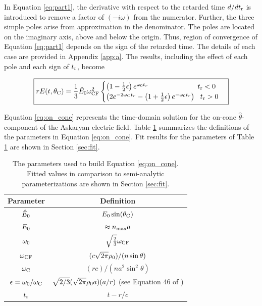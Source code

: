 \documentclass[amsmath,amssymb,aps,prd,10pt,twocolumn]{revtex4}
\begin{document}
In Equation \ref{eq:part1}, the derivative with respect to the retarded time $d/dt_{\rm r}$ is introduced to remove a factor of $(-i\omega)$ from the numerator.  Further, the three simple poles arise from approximation in the denominator.  The poles are located on the imaginary axis, above and below the origin.  Thus, region of convergence of Equation \ref{eq:part1} depends on the sign of the retarded time.  The details of each case are provided in Appendix \ref{app:a}.  The results, including the effect of each pole and each sign of $t_{\rm r}$, become

\begin{widetext}
\begin{equation}
\boxed{
r E(t,\theta_{\rm C}) = \frac{1}{3} \hat{E}_0 \omega_{\rm CF}^2
\begin{cases}
\left(1 - \frac{1}{2}\epsilon \right)e^{\omega_{\rm 0} t_r} ~~~~~~~~~~~~~~~~~~~~~ t_{\rm r} < 0 \\
\left( 2 e^{-2\omega_{\rm C} t_r} - \left(1+\frac{1}{2}\epsilon \right) e^{-\omega_{\rm 0}t_r} \right) ~~ t_{\rm r} > 0
\end{cases}
} \label{eq:on_cone}
\end{equation}
\end{widetext}

Equation \ref{eq:on_cone} represents the time-domain solution for the on-cone $\hat{\theta}$-component of the Askaryan electric field.  Table \ref{tab:features_1} summarizes the definitions of the parameters in Equation \ref{eq:on_cone}.  Fit results for the parameters of Table \ref{tab:features_1} are shown in Section \ref{sec:fit}.

\begin{table}
\renewcommand{\arraystretch}{1.5}
\begin{tabular}{| c | c |}
\hline
Parameter & Definition \\ \hline
$\hat{E}_{\rm 0}$ & $E_{\rm 0} \sin(\theta_{\rm C})$ \\
$E_{\rm 0}$ & $\approx n_{\rm max}a$ \\
$\omega_{\rm 0}$ & $\sqrt{\frac{2}{3}} \omega_{\rm CF}$ \\
$\omega_{\rm CF}$ & $(c\sqrt{2\pi}\rho_{\rm 0})/(n\sin\theta)$ \\
$\omega_{\rm C}$ & $(rc)/(na^2\sin^2\theta)$ \\
$\epsilon = \omega_{\rm 0}/\omega_{\rm C}$ & $\sqrt{2/3} (\sqrt{2\pi} \rho_{\rm 0} a) (a/r) $ (see Equation 46 of \cite{10.1016/j.astropartphys.2017.03.008}) \\
$t_{\rm r}$ & $t - r/c$ \\ \hline
\end{tabular}
\caption{\label{tab:features_1} The parameters used to build Equation \ref{eq:on_cone}.  Fitted values in comparison to semi-analytic parameterizations are shown in Section \ref{sec:fit}.}
\end{table} 
\end{document}
